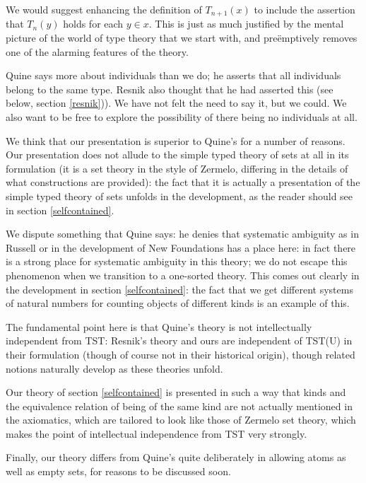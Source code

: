 \documentclass[12pt]{article}
\begin{document}
We would suggest enhancing the definition of $T_{n+1}(x)$ to include the assertion that $T_n(y)$ holds for each $y \in x$.  This is just as much justified by the mental picture of the world of type theory that we start with, and pre\"emptively removes one of the alarming features of the theory.

Quine says more about individuals than we do; he asserts that all individuals belong to the same type.  Resnik also thought that he had asserted this (see below, section \ref{resnik})).  We have not felt the need to say it, but we could.  We also want to be free to explore the possibility of there being no individuals at all.

We think that our presentation is superior to Quine's for a number of reasons.  Our presentation does not allude to the simple typed theory of sets at all in its formulation (it is a set theory in the style of Zermelo, differing in the details of what constructions are provided):  the fact that it is actually a presentation of the simple typed theory of sets unfolds in the development, as the reader should see in section \ref{selfcontained}.  



We dispute something that Quine says:   he denies that systematic ambiguity as in Russell or in the development of New Foundations has a place here:  in fact  there is a strong place for systematic ambiguity in this theory; we do not escape this phenomenon when we transition to a one-sorted theory.  This comes out clearly in the development in section \ref{selfcontained}:  the fact that we get different systems of natural numbers for counting objects of different kinds is an example of this.



The fundamental point here is that Quine's theory is not intellectually independent from TST:  Resnik's theory and ours are independent of TST(U) in their formulation (though of course not in their historical origin), though related notions naturally develop as these theories unfold.

Our theory of section \ref{selfcontained} is presented in such a way that kinds and the equivalence relation of being of the same kind are not actually mentioned in the axiomatics, which are tailored to look like those of Zermelo set theory, which makes the point of intellectual independence from TST very strongly.

Finally, our theory differs from Quine's quite deliberately in allowing atoms as well as empty sets, for reasons to be discussed soon.
\end{document}
